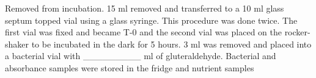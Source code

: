 Removed from incubation. 15 ml removed and transferred to a 10 ml glass septum topped vial using a glass syringe. This procedure was done twice. The first vial was fixed and became T-0 and the second vial was placed on the rocker-shaker to be incubated in the dark for 5 hours. 3 ml was removed and placed into a bacterial vial with _________ ml of gluteraldehyde. Bacterial and absorbance samples were stored in the fridge and nutrient samples